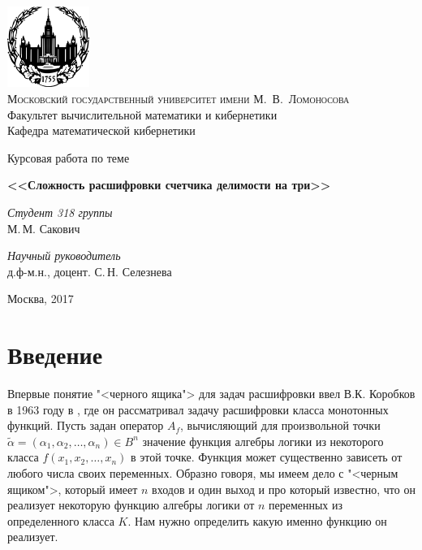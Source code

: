 \documentclass[oneside, final, 14pt]{extreport}
\begin{document}
	\renewcommand\contentsname{Содержание} %
	\thispagestyle{empty}
	
	\begin{center}
		\ \vspace{-1cm}
		
		\includegraphics[width=0.2\textwidth]{logo-mgu.png}\\
		{\scshape Московский государственный университет имени М.~В.~Ломоносова}\\
		Факультет вычислительной математики и кибернетики\\
		Кафедра математической кибернетики
		
		\vfill
		
		{\LARGE Курсовая работа по теме}
		
		\vspace{1cm}
		
		{\Huge\bfseries <<Сложность расшифровки счетчика делимости на три>>}
	\end{center}
	
	\vspace{1cm}
	
	\begin{flushright}
		\large
		\textit{Студент 318 группы}\\
		М.\,М. Сакович
		
		\vspace{5mm}
		
		\textit{Научный руководитель}\\
		д.ф-м.н., доцент. С.\,Н. Селезнева
	\end{flushright}
	
	\vfill
	
	\begin{center}
		Москва, 2017
	\end{center}

	\tableofcontents
	\chapter*{Введение}
	
	Впервые понятие "<черного ящика"> для задач расшифровки ввел В.К. Коробков в 1963 году в \cite{korobkov}, где он рассматривал задачу расшифровки 
	класса монотонных функций.  Пусть задан оператор $A_f$, вычисляющий 
	для произвольной точки	$\tilde{\alpha} = (\alpha_1, \alpha_2, \ldots, \alpha_n) \in B^n$ значение функция алгебры логики из некоторого класса
	 $f(x_1, x_2, \ldots, x_n)$ в этой точке. Функция может существенно зависеть от любого числа своих переменных.
	 Образно говоря, мы имеем дело с "<черным ящиком">, который имеет $n$ входов и один 
	 выход и про который известно, что он реализует некоторую функцию алгебры логики от $n$ переменных из определенного класса  $K$.
	 Нам нужно определить какую именно функцию он реализует.
	 
\end{document}
